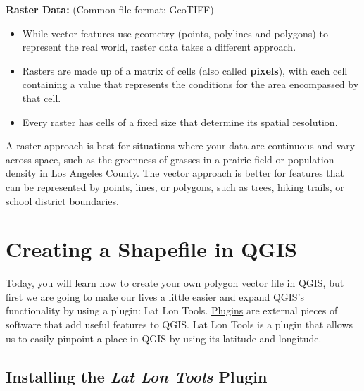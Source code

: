 \documentclass[oneside,a4paper,11pt,explicit]{book}
\begin{document}
\begin{tcolorbox}[colback=yellow!5!white,colframe=IceCreamLeaf,title=\textbf{Vector vs. Raster Data}]
	\vspace{.5em}

	\textbf{Raster Data:} (Common file format: GeoTIFF)
	\begin{itemize}
		\item While vector features use geometry (points, polylines and polygons) to represent the real world, raster data takes a different approach. 
		\item Rasters are made up of a matrix of cells (also called \textbf{pixels}), with each cell containing a value that represents the conditions for the area encompassed by that cell.
		\item Every raster has cells of a fixed size that determine its spatial resolution.
	\end{itemize}
\end{tcolorbox}

A raster approach is best for situations where your data are continuous and vary across space, such as the greenness of grasses in a prairie field or population density in Los Angeles County. The vector approach is better for features that can be represented by points, lines, or polygons, such as trees, hiking trails, or school district boundaries.

	
\section{Creating a Shapefile in QGIS}
	
	Today, you will learn how to create your own polygon vector file in QGIS, but first we are going to make our lives a little easier and expand QGIS's functionality by using a plugin: Lat Lon Tools. \href{https://docs.qgis.org/3.34/en/docs/training_manual/qgis_plugins/fetching_plugins.html}{Plugins} are external pieces of software that add useful features to QGIS. Lat Lon Tools is a plugin that allows us to easily pinpoint a place in QGIS by using its latitude and longitude. 
	
	\subsection{Installing the \textit{Lat Lon Tools} Plugin}
	
\end{document}
